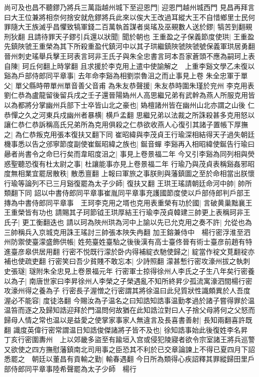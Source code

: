 尚可及也昌不聽鏐乃將兵三萬詣越州城下至迎恩門|{
	迎恩門越州城西門}
見昌再拜言曰大王位兼將相奈何捨安就危鏐將兵此來以俟大王改過耳縱大王不自惜鄉里士民何罪隨大王族滅乎昌懼致犒軍錢二百萬執首謀者吳瑤及巫覡數人送於鏐|{
	犒苦到翻覡刑狄翻}
且請待罪天子鏐引兵還以狀聞|{
	聞於朝也}
王重盈之子保義節度使珙|{
	王重盈先鎮陜虢王重榮為其下所殺重盈代鎮河中以其子珙繼鎮陜虢陜虢號保義軍珙居勇翻}
晉州刺史瑤舉兵擊王珂表言珂非王氏子與朱全忠書言珂本吾家蒼頭不應為嗣珂上表自陳|{
	珂丘何翻上時掌翻}
且求援於李克用上遣中使諭解之　上重李谿文學乙未復以谿為戶部侍郎同平章事|{
	去年命李谿為相劉崇魯沮之而止事見上卷}
朱全忠軍于單父|{
	單父縣時帶單州單音善父音甫}
為朱友恭聲援|{
	朱友恭時圍朱瑾於兖州}
李克用表劉仁恭為盧龍留後留兵戌之壬子還晉陽媯州人高思繼兄弟有武幹為燕人所服克用皆以為都將分掌幽州兵部下士卒皆山北之豪也|{
	媯檀諸州皆在幽州山北亦謂之山後}
仁恭憚之久之河東兵戍幽州者暴横|{
	横戶孟翻}
思繼兄弟以法裁之所誅殺甚多克用怒以讓仁恭仁恭訴稱高氏兄弟所為克用俱殺之仁恭欲收燕人心復引其諸子置帳下厚撫之|{
	為仁恭叛克用張本復扶又翻下同}
崔昭緯與李茂貞王行瑜深相結得天子過失朝廷機事悉以告之邠寧節度副使崔鋋昭緯之族也|{
	鋋音蟬}
李谿再入相昭緯使鋋告行瑜曰曏者尚書令之命巳行矣而韋昭度沮之|{
	事見上卷景福二年}
今又引李谿為同列相與熒惑聖聽恐復有杜太尉之事|{
	杜讓能事亦見上卷景福二年}
行瑜乃與茂貞表稱谿姦邪昭度無相業宜罷居散秩|{
	散悉亶翻}
上報曰軍旅之事朕則與藩鎮圖之至於命相當出朕懷行瑜等論列不已三月谿復罷為太子少師|{
	復扶又翻}
王珙王瑤請朝廷命河中帥|{
	帥所類翻下同}
詔以中書侍郎同平章事崔胤同平章事充護國節度使以戶部侍郎判戶部王摶為中書侍郎同平章事　王珂李克用之壻也克用表重榮有功於國|{
	言破黄巢黜襄王王重榮皆有功也}
請賜其子珂節钺王珙厚結王行瑜李茂貞韓建三帥更上表稱珂非王氏子|{
	更工衡翻迭也}
請以珂為陜州珙為河中上諭以先已允克用之奏不許|{
	允從也為三帥稱兵入京城克用誅王瑤討三帥張本陜失冉翻}
加王鎔兼侍中　楊行密浮淮至泗州防禦使臺濛盛飾供帳|{
	姓苑臺姓臺駘之後後漢有高士臺佟晉有術士臺彦前趙有特進臺彦皋供居用翻}
行密不悦既行濛於卧内得補綻衣馳使歸之|{
	綻當作䘺文莧翻䘺亦補也使疏吏翻}
行密笑曰吾少貧賤不敢忘本|{
	少詩照翻}
濛甚慙行密攻濠州拔之執刺史張璲|{
	璲附朱全忠見上卷景福元年}
行密軍士掠得徐州人李氏之子生八年矣行密養以為子|{
	南唐世家曰李昇徐州人李榮之子榮遇亂不知所終昇少孤流寓濠泗間楊行密攻濠州得之養為子}
行密長子渥憎之行密謂其將徐温曰此兒質狀性識頗異於人吾度渥必不能容|{
	度徒洛翻}
今賜汝為子温名之曰知誥知誥事温勤孝過於諸子嘗得罪於温温笞而逐之及歸知誥迎拜於門温問何故猶在此知誥泣對曰人子捨父母將何之父怒而歸母人情之常也温以是益愛之使掌家事家人無違言及長喜書善射|{
	長知兩翻喜許既翻}
識度英偉行密常謂温日知誥俊傑諸將子皆不及也|{
	徐知誥事始此後復姓李名昇}
丁亥行密圍夀州　上以郊畿多盜至有踰垣入宫或侵犯陵寢者欲令宗室諸王將兵巡警又欲使之四方撫慰藩鎮南北司用事之臣恐其不利於已交章論諫上不得已夏四月下詔悉罷之　朝廷以董昌有貢輸之勤|{
	輸春遇翻}
今日所為類得心疾詔釋其罪縱歸田里戶部侍郎同平章事陸希聲罷為太子少師　楊行

